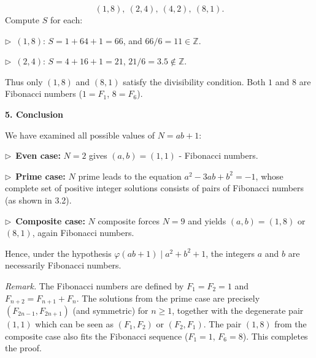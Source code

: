 \documentclass{llmxive}
\providecommand{\solutionheading}[1]{\par\smallskip\noindent\textbf{#1}\par}
\providecommand{\compactbullet}[1]{\par\noindent$\triangleright$~#1\par}
\begin{document}
\[
(1,8),\ (2,4),\ (4,2),\ (8,1).
\]
Compute \(S\) for each:\par
\compactbullet{\((1,8)\): \(S = 1 + 64 + 1 = 66\), and \(66 / 6 = 11 \in \mathbb{Z}\).}
\compactbullet{\((2,4)\): \(S = 4 + 16 + 1 = 21\), \(21/6 = 3.5 \notin \mathbb{Z}\).}
Thus only \((1,8)\) and \((8,1)\) satisfy the divisibility condition. Both \(1\) and \(8\) are Fibonacci numbers (\(1 = F_1\), \(8 = F_6\)).\par
\smallskip
\solutionheading{5. Conclusion}
We have examined all possible values of \(N = ab+1\):\par
\compactbullet{\textbf{Even case:} \(N=2\) gives \((a,b)=(1,1)\) - Fibonacci numbers.}
\compactbullet{\textbf{Prime case:} \(N\) prime leads to the equation \(a^{2} - 3ab + b^{2} = -1\), whose complete set of positive integer solutions consists of pairs of Fibonacci numbers (as shown in 3.2).}
\compactbullet{\textbf{Composite case:} \(N\) composite forces \(N=9\) and yields \((a,b) = (1,8)\) or \((8,1)\), again Fibonacci numbers.}
Hence, under the hypothesis \(\varphi(ab+1) \mid a^{2}+b^{2}+1\), the integers \(a\) and \(b\) are necessarily Fibonacci numbers.\par
\smallskip
\emph{Remark.} The Fibonacci numbers are defined by \(F_1=F_2=1\) and \(F_{n+2}=F_{n+1}+F_n\). The solutions from the prime case are precisely \((F_{2n-1},F_{2n+1})\) (and symmetric) for \(n \ge 1\), together with the degenerate pair \((1,1)\) which can be seen as \((F_1,F_2)\) or \((F_2,F_1)\). The pair \((1,8)\) from the composite case also fits the Fibonacci sequence (\(F_1=1\), \(F_6=8\)). This completes the proof.\par
\par


\endgroup
\end{document}
